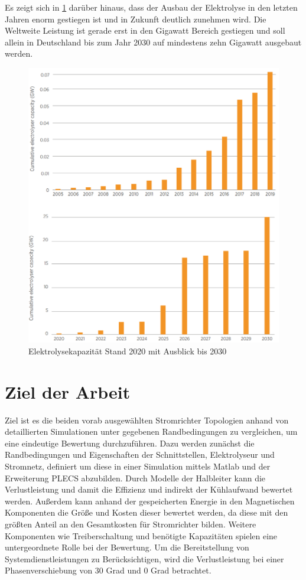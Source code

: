 Es zeigt sich in \ref{fig:elycapacity} darüber hinaus, dass der Ausbau der Elektrolyse in den letzten Jahren enorm gestiegen ist  und in Zukunft deutlich zunehmen wird. Die Weltweite Leistung ist gerade erst in den Gigawatt Bereich gestiegen und soll allein in Deutschland bis zum Jahr 2030 auf mindestens zehn Gigawatt ausgebaut werden.

\begin{figure}
	\centering
	\includegraphics[width=0.7\linewidth]{content/Grafiken/Ely_Capacity}
	\caption[Elektrolyse Kapazität bis 2030]{Elektrolysekapazität Stand 2020 mit Ausblick bis 2030 \cite{IRENA2020}}
	\label{fig:elycapacity}
\end{figure}

\section{Ziel der Arbeit}
Ziel ist es die beiden vorab ausgewählten Stromrichter Topologien anhand von detaillierten Simulationen unter gegebenen Randbedingungen zu vergleichen, um eine eindeutige Bewertung durchzuführen. Dazu werden zunächst die Randbedingungen und Eigenschaften der Schnittstellen, Elektrolyseur und Stromnetz, definiert um diese in einer Simulation mittels Matlab und der Erweiterung PLECS abzubilden. Durch Modelle der Halbleiter kann die Verlustleistung und damit die Effizienz und indirekt der Kühlaufwand bewertet werden. Außerdem kann anhand der gespeicherten Energie in den Magnetischen Komponenten die Größe und Kosten dieser bewertet werden, da diese mit den größten Anteil an den Gesamtkosten für Stromrichter bilden. Weitere Komponenten wie Treiberschaltung und benötigte Kapazitäten spielen eine untergeordnete Rolle bei der Bewertung. Um die Bereitstellung von Systemdienstleistungen zu Berücksichtigen, wird die Verlustleistung bei einer Phasenverschiebung von 30 Grad und 0 Grad betrachtet.